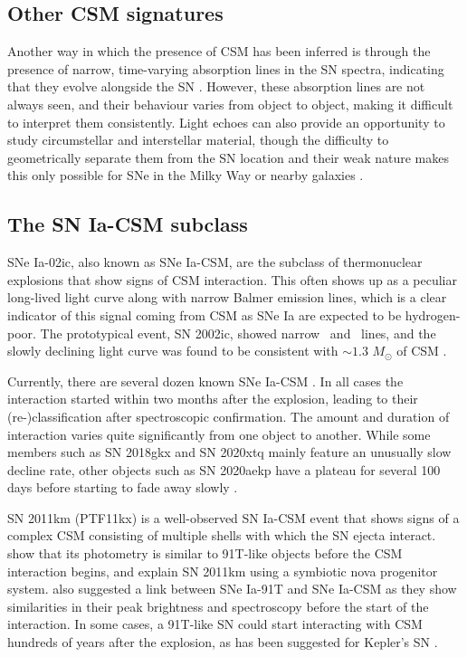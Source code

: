 \documentclass[a4paper,oneside,12pt, class=Latex/Classes/PhDthesisPSnPDF, crop=false]{standalone}
\begin{document}
\subsection{Other CSM signatures}
Another way in which the presence of CSM has been inferred is through the presence of narrow, time-varying absorption lines in the SN spectra, indicating that they evolve alongside the SN \citep[e.g.,][]{2006X, Sternberg_NaID}. However, these absorption lines are not always seen, and their behaviour varies from object to object, making it difficult to interpret them consistently. Light echoes can also provide an opportunity to study circumstellar and interstellar material, though the difficulty to geometrically separate them from the SN location and their weak nature makes this only possible for SNe in the Milky Way or nearby galaxies \citep{Patat_light_echoes, Tycho_Brahe_classif, 2012cg}.


\subsection{The SN Ia-CSM subclass}
\label{Ia_CSM}
SNe Ia-02ic, also known as SNe Ia-CSM, are the subclass of thermonuclear explosions that show signs of CSM interaction. This often shows up as a peculiar long-lived light curve along with narrow Balmer emission lines, which is a clear indicator of this signal coming from CSM as SNe Ia are expected to be hydrogen-poor. The prototypical event, SN 2002ic, showed narrow \Halpha\ and \Hbeta\ lines, and the slowly declining light curve was found to be consistent with $\sim1.3$ $M_\odot$ of CSM \citep{02ic_H_det, Hamuy_02ic, 02ic_slow_decay, single_degen_CSM_gen}.

Currently, there are several dozen known SNe Ia-CSM \citep{2005gj, Ia-CSM_Silverman, Ia-CSM_BTS}. In all cases the interaction started within two months after the explosion, leading to their (re-)classification after spectroscopic confirmation. The amount and duration of interaction varies quite significantly from one object to another. While some members such as SN 2018gkx and SN 2020xtq mainly feature an unusually slow decline rate, other objects such as SN 2020aekp have a plateau for several 100 days before starting to fade away slowly \citep{Ia-CSM_BTS}.

SN 2011km (PTF11kx) is a well-observed SN Ia-CSM event that shows signs of a complex CSM consisting of multiple shells with which the SN ejecta interact. \citet{ptf11kx} show that its photometry is similar to 91T-like objects before the CSM interaction begins, and explain SN 2011km using a symbiotic nova progenitor system. \citet{Ia-CSM_and_91T_connection} also suggested a link between SNe Ia-91T and SNe Ia-CSM as they show similarities in their peak brightness and spectroscopy before the start of the interaction. In some cases, a 91T-like SN could start interacting with CSM hundreds of years after the explosion, as has been suggested for Kepler’s SN \citep{Kepler_91T, Kepler_CSM}.
\end{document}
